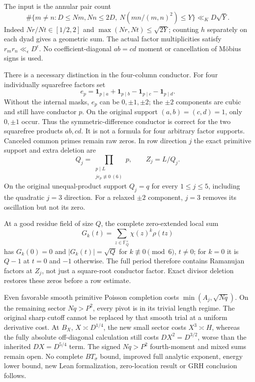 The input is the annular pair count
\[
 \#\{m\ne n:D\le Nm,Nn\le2D,\ N(mn/(m,n)^2)\le Y\}
 \ll_K D\sqrt Y.
\]
Indeed $Nr/Nt\in[1/2,2]$ and
$\max(Nr,Nt)\le\sqrt{2Y}$; counting $h$ separately on each dyad gives a
geometric sum. The actual factor multiplicities satisfy
$r_mr_n\ll_\epsilon D^\epsilon$. No coefficient-diagonal
$ab=cd$ moment or cancellation of M\"obius signs is used.

There is a necessary distinction in the four-column conductor.
For four individually squarefree factors set
\[
 e_p=\mathbf1_{p\mid a}+\mathbf1_{p\mid b}
       -\mathbf1_{p\mid c}-\mathbf1_{p\mid d}.
\]
Without the internal masks, $e_p$ can be $0,\pm1,\pm2$; the $\pm2$
components are cubic and still have conductor $p$. On the original
support $(a,b)=(c,d)=1$, only $0,\pm1$ occur. Thus the
symmetric-difference conductor is correct for the two squarefree
products $ab,cd$. It is not a formula for four arbitrary factor supports.
Canceled common primes remain raw zeros. In row direction $j$ the exact
primitive support and extra deletion are
\[
 Q_j=\prod_{\substack{p\mid L\\je_p\not\equiv0\ (6)}}p,\qquad
 Z_j=L/Q_j.
\]
On the original unequal-product support $Q_j=q$ for every $1\le j\le5$,
including the quadratic $j=3$ direction. For a relaxed $\pm2$ component,
$j=3$ removes its oscillation but not its zero.

At a good residue field of size $Q$, the complete zero-extended local sum
\[
 G_k(t)=\sum_{z\in\mathbb F_Q^\times}\chi(z)^k\rho(tz)
\]
has $G_k(0)=0$ and $|G_k(t)|=\sqrt Q$ for $k\not\equiv0\pmod6$, $t\ne0$;
for $k=0$ it is $Q-1$ at $t=0$ and $-1$ otherwise.
The full period therefore contains Ramanujan factors at $Z_j$, not just
a square-root conductor factor. Exact divisor deletion restores these
zeros before a row estimate.

Even favorable smooth primitive Poisson completion costs
$\min(A_j,\sqrt{Nq})$. On the remaining sector $Nq>P^2$, every pivot
is in its trivial length regime. The original sharp cutoff cannot be
replaced by that smooth trial at a uniform derivative cost.
At $B_X$, $X\asymp D^{1/4}$, the new small sector costs $X^3\asymp H$,
whereas the fully absolute off-diagonal calculation still costs
$DX^2=D^{3/2}$, worse than the inherited $DX=D^{5/4}$ term.
The signed $Nq>P^2$ fourth-moment and mixed sums remain open.
No complete $BT_\sigma$ bound, improved full analytic exponent, energy
lower bound, new Lean formalization, zero-location result or GRH
conclusion follows.
